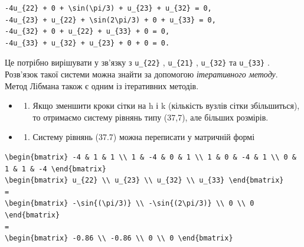 \documentclass[
  ukrainian,
]{article}
\providecommand{\tightlist}{%
  \setlength{\itemsep}{0pt}\setlength{\parskip}{0pt}}
\begin{document}
\begin{verbatim}
-4u_{22} + 0 + \sin(\pi/3) + u_{23} + u_{32} = 0,
-4u_{23} + u_{22} + \sin(2\pi/3) + 0 + u_{33} = 0,
-4u_{32} + 0 + u_{22} + u_{33} + 0 = 0,
-4u_{33} + u_{32} + u_{23} + 0 + 0 = 0.
\end{verbatim}

Це потрібно вирішувати у зв'язку з \texttt{u\_\{22\}} ,
\texttt{u\_\{21\}} , \texttt{u\_\{32\}} та \texttt{u\_\{33\}} .
Розв'язок такої системи можна знайти за допомогою \emph{ітеративного
методу}. Метод Лібмана також є одним із ітеративних методів.

\begin{itemize}
\tightlist
\item
  \begin{enumerate}
  \def\labelenumi{\arabic{enumi}.}
  \setcounter{enumi}{1}
  \tightlist
  \item
    Якщо зменшити кроки сітки на h і k (кількість вузлів сітки
    збільшиться), то отримаємо систему рівнянь типу (37,7), але більших
    розмірів.
  \end{enumerate}
\item
  \begin{enumerate}
  \def\labelenumi{\arabic{enumi}.}
  \setcounter{enumi}{2}
  \tightlist
  \item
    Систему рівнянь (37.7) можна переписати у матричній формі
  \end{enumerate}
\end{itemize}

\begin{verbatim}
\begin{bmatrix} -4 & 1 & 1 \\ 1 & -4 & 0 & 1 \\ 1 & 0 & -4 & 1 \\ 0 & 1 & 1 & -4 \end{bmatrix}
\begin{bmatrix} u_{22} \\ u_{23} \\ u_{32} \\ u_{33} \end{bmatrix}
=
\begin{bmatrix} -\sin{(\pi/3)} \\ -\sin{(2\pi/3)} \\ 0 \\ 0 \end{bmatrix}
=
\begin{bmatrix} -0.86 \\ -0.86 \\ 0 \\ 0 \end{bmatrix}
\end{verbatim}
\end{document}
